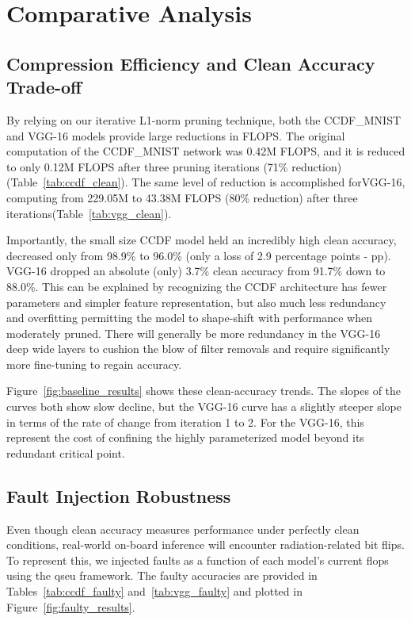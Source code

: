 \section{Comparative Analysis}
\label{sec:analysis}

\subsection{Compression Efficiency and Clean Accuracy Trade-off}
By relying on our iterative L1-norm pruning technique, both the CCDF\_MNIST and VGG-16 models provide large reductions in FLOPS. The original computation of the CCDF\_MNIST network was 0.42M FLOPS, and it is reduced to only 0.12M FLOPS after three pruning iterations (71\% reduction)(Table~\ref{tab:ccdf_clean}). The same level of reduction is accomplished forVGG-16, computing from 229.05M to 43.38M FLOPS (80\% reduction) after three iterations(Table~\ref{tab:vgg_clean}).

Importantly, the small size CCDF model held an incredibly high clean accuracy, decreased only from 98.9\% to 96.0\% (only a loss of 2.9 percentage points - pp). VGG-16 dropped an absolute (only) 3.7\% clean accuracy from 91.7\% down to 88.0\%. This can be explained by recognizing the CCDF architecture has fewer parameters and simpler feature representation, but also much less redundancy and overfitting permitting the model to shape-shift with performance when moderately pruned. There will generally be more redundancy in the VGG-16 deep wide layers to cushion the blow of filter removals and require significantly more fine-tuning to regain accuracy.

Figure~\ref{fig:baseline_results} shows these clean-accuracy trends. The slopes of the curves both show slow decline, but the VGG-16 curve has a slightly steeper slope in terms of the rate of change from iteration 1 to 2.  For the VGG-16, this represent the cost of confining the highly parameterized model beyond its redundant critical point.

\subsection{Fault Injection Robustness}
Even though clean accuracy measures performance under perfectly clean conditions, real-world on-board inference will encounter radiation-related bit flips. To represent this, we injected faults as a function of each model's current \gls{flops} using the \gls{qseu} framework. The faulty accuracies are provided in Tables~\ref{tab:ccdf_faulty} and~\ref{tab:vgg_faulty} and plotted in Figure~\ref{fig:faulty_results}.

